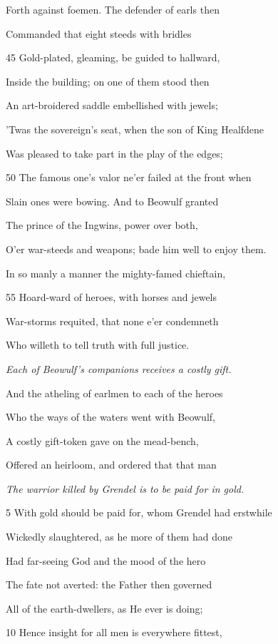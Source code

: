 Forth against foemen. The defender of earls then

Commanded that eight steeds with bridles

45
Gold-plated, gleaming, be guided to hallward,

Inside the building; on one of them stood then

An art-broidered saddle embellished with jewels;

’Twas the sovereign’s seat, when the son of King Healfdene

Was pleased to take part in the play of the edges;

50
The famous one’s valor ne’er failed at the front when

Slain ones were bowing. And to Beowulf granted

The prince of the Ingwins, power over both,

O’er war-steeds and weapons; bade him well to enjoy them.

In so manly a manner the mighty-famed chieftain,

55
Hoard-ward of heroes, with horses and jewels

War-storms requited, that none e’er condemneth

Who willeth to tell truth with full justice.



\emph{Each of Beowulf’s
companions receives
a costly gift.}

And the atheling of earlmen to each of the heroes

Who the ways of the waters went with Beowulf,

A costly gift-token gave on the mead-bench,

Offered an heirloom, and ordered that that man

\emph{The warrior killed
by Grendel is to be
paid for in gold.}

5
With gold should be paid for, whom Grendel had erstwhile

Wickedly slaughtered, as he more of them had done

Had far-seeing God and the mood of the hero

The fate not averted: the Father then governed

All of the earth-dwellers, as He ever is doing;

10
Hence insight for all men is everywhere fittest,

